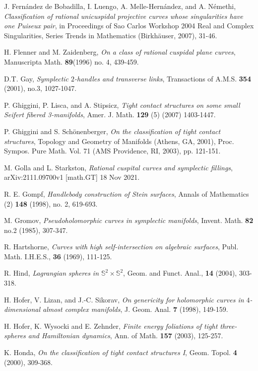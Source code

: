 \documentclass[11pt]{amsart}
\theoremstyle{plain}
\numberwithin{theorem}{section}
\theoremstyle{definition}
\newcommand{\s}{{\mathbb S}}
\begin{document}
\begin{thebibliography}{}
 J. Fernández de Bobadilla, I. Luengo, A. Melle-Hernández, and A. Némethi, {\em Classification of rational unicuspidal projective curves whose singularities have one Puiseux pair}, in Proceedings of Sao Carlos Workshop 2004 Real and Complex Singularities, Series Trends in Mathematics (Birkhäuser, 2007), 31-46.

 H. Flenner and M. Zaidenberg, {\em On a class of rational cuspidal plane curves},
Manuscripta Math. {\bf 89}(1996) no. 4, 439-459.

    
 D.T. Gay, {\em Symplectic $2$-handles and transverse links}, Transactions of A.M.S. {\bf 354}
(2001), no.3, 1027-1047.

 P. Ghiggini, P. Lisca, and A. Stipsicz, {\em Tight contact structures on some small 
Seifert fibered 3-manifolds}, Amer. J. Math. {\bf 129} (5) (2007) 1403-1447.

 P. Ghiggini and S. Sch\"{o}nenberger, {\em On the classification of tight contact structures}, Topology and Geometry of Manifolds (Athens, GA, 2001), Proc. Sympos. Pure Math. Vol. 71 (AMS Providence, RI, 2003), pp. 121-151. 

 M. Golla and L. Starkston, {\em Rational cuspital curves and symplectic fillings}, arXiv:2111.09700v1 [math.GT] 18 Nov 2021.

 R. E. Gompf, {\em Handlebody construction of Stein surfaces}, 
Annals of Mathematics (2) {\bf 148} (1998), no. 2, 619-693.

 M. Gromov, {\em Pseudoholomorphic curves in symplectic manifolds}, Invent. Math. {\bf 82} no.2 (1985), 307-347. 

 R. Hartshorne, {\em Curves with high self-intersection on algebraic surfaces}, 
Publ. Math. I.H.E.S., {\bf 36} (1969), 111-125.

 R. Hind, {\em Lagrangian spheres in $\s^2\times \s^2$}, Geom. and Funct. Anal., {\bf 14} (2004), 303-318.

 H. Hofer, V. Lizan, and J.-C. Sikorav, {\em On genericity for holomorphic 
curves in $4$-dimensional almost complex manifolds}, J. Geom. Anal. {\bf 7} (1998), 149-159. 

 H. Hofer, K. Wysocki and E. Zehnder, {\em Finite energy foliations of tight 
three-spheres and Hamiltonian dynamics}, Ann. of Math. {\bf 157} (2003), 125-257.

 K. Honda, {\em On the classification of tight contact structures I}, Geom. Topol.
{\bf 4} (2000), 309-368. 


\end{thebibliography}
\end{document}
